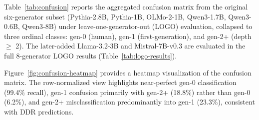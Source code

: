  Table~\ref{tab:confusion} reports the aggregated confusion matrix from the original six-generator subset (Pythia-2.8B, Pythia-1B, OLMo-2-1B, Qwen3-1.7B, Qwen3-0.6B, Qwen3-8B) under leave-one-generator-out (LOGO) evaluation, collapsed to three ordinal classes: gen-0 (human), gen-1 (first-generation), and gen-2+ (depth $\geq$ 2).
The later-added Llama-3.2-3B and Mistral-7B-v0.3 are evaluated in the full 8-generator LOGO results (Table~\ref{tab:logo-results}).

\begin{table}[ht]
\centering
\small
\caption{Aggregated 3-class confusion matrix from 6-generator LOGO evaluation ($N=27{,}529$). Each cell shows count and row-normalized percentage. Gen-0 is near-perfectly identified. Gen-1 errors are asymmetric: misclassification as gen-2+ (18.8\%) is 3$\times$ more frequent than as gen-0 (6.2\%). Gen-1 text already carries detectable recursive distortion.}
\label{tab:confusion}
\end{table}

 Figure~\ref{fig:confusion-heatmap} provides a heatmap visualization of the confusion matrix.
The row-normalized view highlights near-perfect gen-0 classification (99.4\% recall), gen-1 confusion primarily with gen-2+ (18.8\%) rather than gen-0 (6.2\%), and gen-2+ misclassification predominantly into gen-1 (23.3\%), consistent with DDR predictions.
